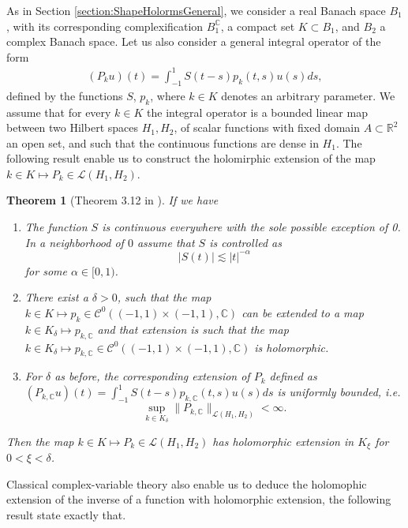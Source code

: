 \documentclass{article}
\newtheorem{theorem}{Theorem}[section]
\newcommand{\IC}{{\mathbb C}}
\newcommand{\IR}{{\mathbb R}}
\newcommand{\cmspace}[3]{\mathcal{C}^{#1} \left( #2, #3 \right)}
\begin{document}
As in Section \ref{section:ShapeHolormsGeneral}, we consider a real Banach space $B_1$, with its corresponding complexification $B_1^{\IC}$, a compact set $K \subset B_1$, and $B_2$ a complex Banach space. Let us also consider a general integral operator of the form 
\begin{align*}
(P_k u)(t) = \int_{-1}^{1} S(t-s) p_k(t,s) u(s) ds,
\end{align*}
defined by the functions $S$, $p_k$, where $k \in K$ denotes an arbitrary parameter. We assume that for every $k \in K$ the integral operator is a bounded linear map between two Hilbert spaces $H_1,H_2$, of scalar functions with fixed domain  $A \subset \IR^2$ an open set, and such that the continuous functions are dense in $H_1$. The following result enable us to construct the holomirphic extension of the map $k  \in K \mapsto P_k \in \mathcal{L}(H_1,H_2)$. 

\begin{theorem}[Theorem 3.12 in \cite{Henriquez2021}] \label{thrm:abstractholm}
If we have 
\begin{enumerate}
\item 
The function $S$ is continuous everywhere with the sole possible  exception of 0. In a neighborhood of $0$ assume that $S$ is controlled as 
$$|S(t)| \lesssim| t|^{-\alpha}$$
for some $\alpha \in [0,1)$. 
\item 
There exist a $\delta >0$, such that the map $k \in K \mapsto p_k \in \cmspace{0}{(-1,1)\times(-1,1)}{\IC}$ can be extended to a map $k \in K_\delta \mapsto p_{k,\IC}$ and that extension is such that 
the map $k \in K_\delta \mapsto p_{k,\IC } \in \cmspace{0}{(-1,1)\times(-1,1)}{\IC}$ is holomorphic. 
\item 
For $\delta$ as before, the corresponding extension of $P_k$ defined as $(P_{k,\IC}u)(t) = \int_{-1}^{1} S(t-s) p_{k,\IC}(t,s) u(s) ds$ is uniformly bounded, i.e. 
$$ \sup_{k \in K_\delta} \| P_{k,\IC} \|_{\mathcal{L}(H_1,H_2)}< \infty.$$
\end{enumerate}
Then the map $k \in K \mapsto P_{k} \in \mathcal{L}(H_1,H_2)$ has holomorphic extension in $K_\xi$ for $0<\xi < \delta$.
\end{theorem}
Classical complex-variable theory also enable us to deduce the holomophic extension of the inverse of a function with holomorphic extension, the following result state exactly that.
\end{document}
